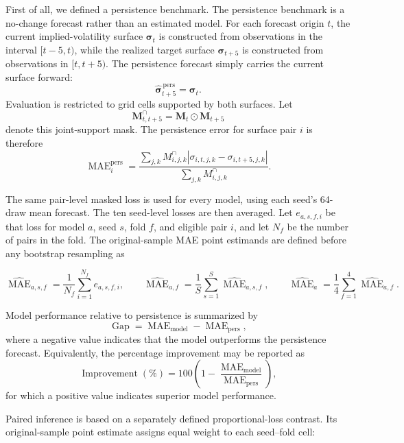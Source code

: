First of all, we defined a persistence benchmark. The persistence benchmark is a no-change forecast rather than an estimated model. For each forecast origin \(t\), the current implied-volatility surface \(\boldsymbol{\sigma}_{t}\) is constructed from observations in the interval \([t-5,t)\), while the realized target surface \(\boldsymbol{\sigma}_{t+5}\) is constructed from observations in \([t,t+5)\). The persistence forecast simply carries the current surface forward:
\[
\widehat{\boldsymbol{\sigma}}^{\,\mathrm{pers}}_{t+5}
=
\boldsymbol{\sigma}_{t}.
\]
Evaluation is restricted to grid cells supported by both surfaces. Let
\[
\mathbf{M}^{\cap}_{t,t+5}
=
\mathbf{M}_{t}\odot\mathbf{M}_{t+5}
\]
denote this joint-support mask. The persistence error for surface pair \(i\) is therefore
\[
\operatorname{MAE}^{\mathrm{pers}}_{i}
=
\frac{
\sum_{j,k} M^{\cap}_{i,j,k}
\left|
\sigma_{i,t,j,k}-\sigma_{i,t+5,j,k}
\right|
}{
\sum_{j,k} M^{\cap}_{i,j,k}
}.
\]


The same pair-level masked loss is used for every model, using each seed's 64-draw mean forecast. The ten seed-level losses are then averaged. Let $e_{a,s,f,i}$ be that loss for model $a$, seed $s$, fold $f$, and eligible pair $i$, and let $N_f$ be the number of pairs in the fold. The original-sample MAE point estimands are defined before any bootstrap resampling as


\begin{equation}
\label{eq:ch3:observed_mae_weighting}
\widehat{\operatorname{MAE}}_{a,s,f}
=
\frac{1}{N_f}
\sum_{i=1}^{N_f}e_{a,s,f,i},
\qquad
\widehat{\operatorname{MAE}}_{a,f}
=
\frac{1}{S}
\sum_{s=1}^{S}
\widehat{\operatorname{MAE}}_{a,s,f},
\qquad
\widehat{\operatorname{MAE}}_a
=
\frac{1}{4}
\sum_{f=1}^{4}
\widehat{\operatorname{MAE}}_{a,f}.
\end{equation}




Model performance relative to persistence is summarized by
\[
\operatorname{Gap}
=
\operatorname{MAE}_{\mathrm{model}}
-
\operatorname{MAE}_{\mathrm{pers}},
\]
where a negative value indicates that the model outperforms the persistence forecast. Equivalently, the percentage improvement may be reported as
\[
\operatorname{Improvement}(\%)
=
100\left(
1-
\frac{\operatorname{MAE}_{\mathrm{model}}}
{\operatorname{MAE}_{\mathrm{pers}}}
\right),
\]
for which a positive value indicates superior model performance.  


Paired inference is based on a separately defined proportional-loss contrast.
Its original-sample point estimate assigns equal weight to each seed--fold
cell:

